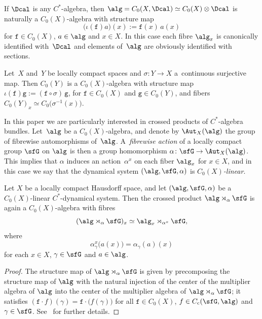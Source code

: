 \begin{Example}
If $\Dcal$ is any $C^*$-algebra, then $\alg=C_0(X,\Dcal)\simeq
C_0(X)\otimes\Dcal$ is naturally a $C_0(X)$-algebra with structure map
\[
\big(\iota(\mathtt{f})a\big)(x) := \mathtt{f}(x)\,a(x)
\]
for $\mathtt{f}\in C_0(X)$, $a\in\alg$ and $x\in X$. In this case each fibre
$\alg_x$ is canonically identified with~$\Dcal$ and elements of~$\alg$
are obviously identified with sections.
\end{Example}

\begin{Example}\label{ex:ctsmaps}
Let~$X$ and~$Y$ be locally compact spaces and $\sigma\colon Y\to X$ a~continuous surjective map. Then $C_0(Y)$ is a $C_0(X)$-algebra with structure map
$\iota(\mathtt{f})\mathtt{g}:=(\mathtt{f}\circ\sigma)\,\mathtt{g}$, for $\mathtt{f}\in C_0(X)$ and $\mathtt{g}\in C_0(Y)$,
and fibers $C_0(Y)_x\simeq C_0\big(\sigma^{-1}(x)\big)$.
\end{Example}

In this paper we are particularly interested in crossed
products of $C^*$-algebra bundles. Let~$\alg$ be a $C_0(X)$-algebra,
and denote by $\Aut_X(\alg)$ the group of {fibrewise
automorphisms} of~$\alg$. A~\emph{fibrewise action} of a locally compact group $\sfG$ on
$\alg$ is then a group homomorphism $\alpha\colon \sfG\to\Aut_X(\alg)$. This
implies that $\alpha$ induces an action~$\alpha^x$ on each fiber
$\alg_x$ for $x\in X$, and in
this case we say that the dynamical system $(\alg,\sfG,\alpha)$ is
\emph{$C_0(X)$-linear}.

\begin{Theorem}\label{thm:crossedfibres}
Let $X$ be a locally compact Hausdorff space, and let
$(\alg,\sfG,\alpha)$ be a $C_0(X)$-linear $C^*$-dynamical system. Then
the crossed product $\alg\rtimes_\alpha\sfG$ is again a
$C_0(X)$-algebra with fibres
\[
(\alg\rtimes_\alpha\sfG)_x\simeq\alg_x\rtimes_{\alpha^x}\sfG ,
\]
where
\[
\alpha_\gamma^x\big(a(x)\big) = \alpha_\gamma(a)(x)
\]
for each $x\in X$, $\gamma\in\sfG$ and $a\in\alg$.
\end{Theorem}

\begin{proof}The structure map
of $\alg\rtimes_\alpha\sfG$ is given by precomposing the structure map
of $\alg$ with the natural injection of the center of the multiplier
algebra of $\alg$ into the center of the multiplier algebra of
$\alg\rtimes_\alpha\sfG$; it satisfies
$(\mathtt{f}\cdot f)(\gamma)=\mathtt{f}\cdot\big(f(\gamma)\big)$ for all
$\mathtt{f}\in C_0(X)$, $f\in C_{\rm c}(\sfG,\alg)$ and
$\gamma\in\sfG$. See~\cite[Theorem~8.4]{Williams2007} for further
details.
\end{proof}

